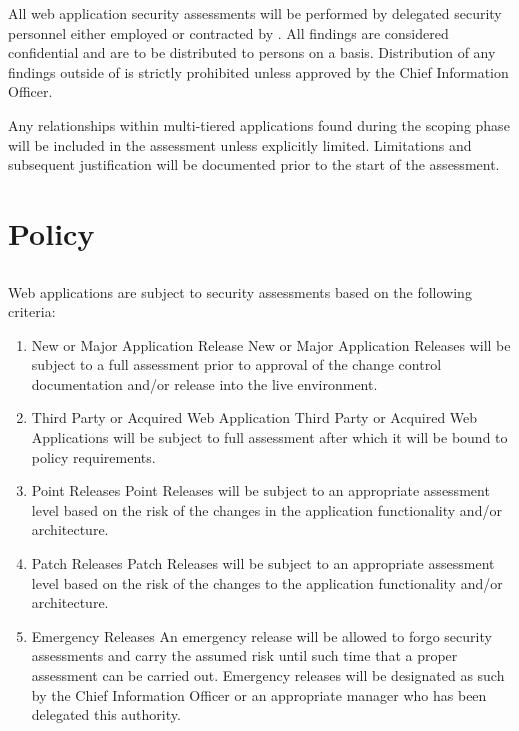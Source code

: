 All web application security assessments will be performed by delegated security personnel either employed or contracted by \CompanyName{}.  
All findings are considered confidential and are to be distributed to persons on a  basis.  
Distribution of any findings outside of \CompanyName{} is strictly prohibited unless approved by the Chief Information Officer.

Any relationships within multi-tiered applications found during the scoping phase will be included in the assessment unless explicitly limited.  
Limitations and subsequent justification will be documented prior to the start of the assessment.
\section{Policy}
\subsection*{}
Web applications are subject to security assessments based on the following criteria:
\begin{enumerate}
\item{New or Major Application Release}
New or Major Application Releases will be subject to a full assessment prior to approval of the change control documentation and/or release into the live environment.
\item{Third Party or Acquired Web Application}
Third Party or Acquired Web Applications will be subject to full assessment after which it will be bound to policy requirements.
\item{Point Releases}
Point Releases will be subject to an appropriate assessment level based on the risk of the changes in the application functionality and/or architecture.
\item{Patch Releases}
Patch Releases will be subject to an appropriate assessment level based on the risk of the changes to the application functionality and/or architecture.
\item{Emergency Releases}
An emergency release will be allowed to forgo security assessments and carry the assumed risk until such time that a proper assessment can be carried out.  
Emergency releases will be designated as such by the Chief Information Officer or an appropriate manager who has been delegated this authority.
\end{enumerate}
